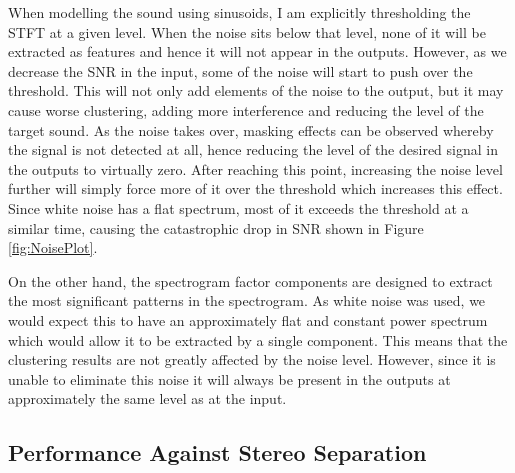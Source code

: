 \documentclass[12pt,a4paper,twoside,openright]{report}
\begin{document}

When modelling the sound using sinusoids, I am explicitly thresholding the STFT at a given level. When the noise sits below that level, none of it will be extracted as features and hence it will not appear in the outputs. However, as we decrease the SNR in the input, some of the noise will start to push over the threshold. This will not only add elements of the noise to the output, but it may cause worse clustering, adding more interference and reducing the level of the target sound. As the noise takes over, masking effects can be observed whereby the signal is not detected at all, hence reducing the level of the desired signal in the outputs to virtually zero. After reaching this point, increasing the noise level further will simply force more of it over the threshold which increases this effect. Since white noise has a flat spectrum, most of it exceeds the threshold at a similar time, causing the catastrophic drop in SNR shown in Figure \ref{fig:NoisePlot}.

On the other hand, the spectrogram factor components are designed to extract the most significant patterns in the spectrogram. As white noise was used, we would expect this to have an approximately flat and constant power spectrum which would allow it to be extracted by a single component. This means that the clustering results are not greatly affected by the noise level. However, since it is unable to eliminate this noise it will always be present in the outputs at approximately the same level as at the input.

\subsection{Performance Against Stereo Separation}

\end{document}
